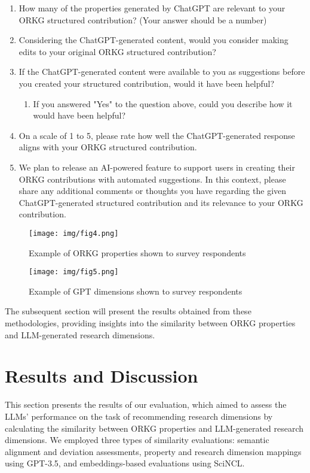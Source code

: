 \begin{enumerate}
    \item How many of the properties generated by ChatGPT are relevant to your ORKG structured contribution? (Your answer should be a number)
    \item Considering the ChatGPT-generated content, would you consider making edits to your original ORKG structured contribution?
    \item If the ChatGPT-generated content were available to you as suggestions before you created your structured contribution, would it have been helpful?
    \begin{enumerate}
        \item If you answered "Yes" to the question above, could you describe how it would have been helpful?
    \end{enumerate}
    \item On a scale of 1 to 5, please rate how well the ChatGPT-generated response aligns with your ORKG structured contribution.
    \item We plan to release an AI-powered feature to support users in creating their ORKG contributions with automated suggestions. In this context, please share any additional comments or thoughts you have regarding the given ChatGPT-generated structured contribution and its relevance to your ORKG contribution.
\end{enumerate}

\begin{figure}[!htb]
\texttt{[image: img/fig4.png]}
\caption{Example of ORKG properties shown to survey respondents\label{figure stage1 orkg}}
\end{figure} 

\begin{figure}[!htb]
\texttt{[image: img/fig5.png]}
\caption{Example of GPT dimensions shown to survey respondents\label{figure stage1 gpt}}
\end{figure} 

The subsequent section will present the results obtained from these methodologies, providing insights into the similarity between ORKG properties and LLM-generated research dimensions.

\section{Results and Discussion}

This section presents the results of our evaluation, which aimed to assess the LLMs' performance on the task of recommending research dimensions by calculating the similarity between ORKG properties and LLM-generated research dimensions. We employed three types of similarity evaluations: semantic alignment and deviation assessments, property and research dimension mappings using GPT-3.5, and embeddings-based evaluations using SciNCL.

